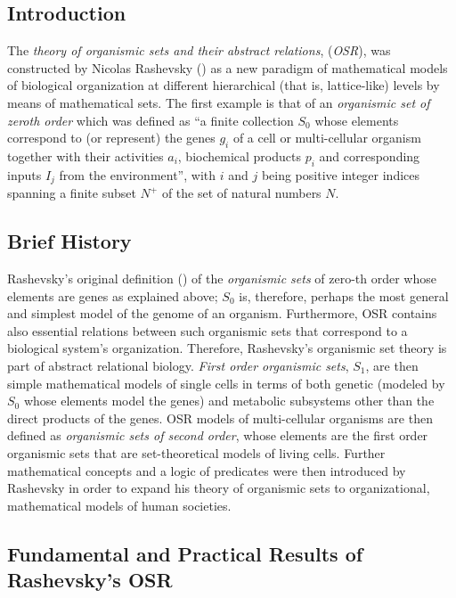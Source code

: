 \documentclass[12pt]{article}
\theoremstyle{plain}
\theoremstyle{definition}
\numberwithin{equation}{section}
\begin{document}
\subsection{Introduction}

 The {\em theory of organismic sets and their abstract relations}, ({\em OSR}), was constructed by Nicolas Rashevsky (\cite{NRashevsky1-yr1965, NRashevsky2-1969}) as a new paradigm of mathematical models of biological organization at different hierarchical (that is, lattice-like) levels by means of mathematical sets. The first example is that of an {\em organismic set of zeroth order} which was defined as ``a finite collection $S_0$ whose elements correspond to (or represent) the genes $g_i$ of a cell or multi-cellular organism together with their activities $a_i$, biochemical products $p_i$ and corresponding inputs $I_j$ from the environment'', with  $i$ and $j$ being positive integer indices spanning a finite subset $N^+$ of the set of natural numbers $N$. 
 
\subsection{Brief History}

  Rashevsky's original definition (\cite{NRashevsky2-1969}) of the \emph{organismic sets} of zero-th order 
whose elements are genes as explained above; $S_0$ is, therefore, perhaps the most general and simplest model
of the genome of an organism. Furthermore, OSR contains also essential relations between such organismic sets
that correspond to a biological system's organization. Therefore, Rashevsky's organismic set theory is part of abstract relational biology.  {\em First order organismic sets}, $S_1$, are then simple mathematical models of single cells in terms of both genetic (modeled by $S_0$ whose elements model the genes) and metabolic subsystems other than the 
direct products of the genes. OSR models of multi-cellular organisms are then defined as {\em organismic sets of second order}, whose elements are the first order organismic sets that are set-theoretical models
of living cells. Further mathematical concepts and a logic of predicates were then introduced by Rashevsky in order to expand his theory of organismic sets to organizational, mathematical models of human societies. 


\subsection{Fundamental and Practical Results of Rashevsky's OSR} 
 
\end{document}

